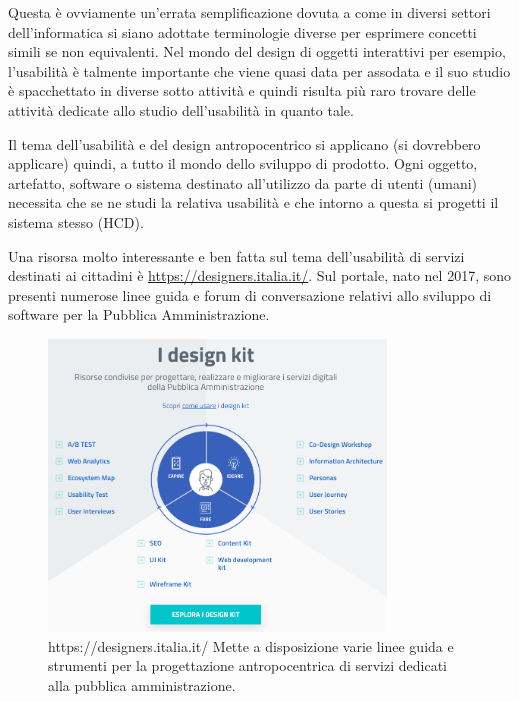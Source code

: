 Questa è ovviamente un'errata semplificazione dovuta a come in diversi settori dell'informatica si siano adottate terminologie diverse per esprimere concetti simili se non equivalenti. Nel mondo del design di oggetti interattivi per esempio, l'usabilità è talmente importante che viene quasi data per assodata e il suo studio è spacchettato in diverse sotto attività e quindi risulta più raro trovare delle attività dedicate allo studio dell'usabilità in quanto tale.

Il tema dell'usabilità e del design antropocentrico si applicano (si dovrebbero applicare) quindi, a tutto il mondo dello sviluppo di prodotto. Ogni oggetto, artefatto, software o sistema destinato all'utilizzo da parte di utenti (umani) necessita che se ne studi la relativa usabilità e che intorno a questa si progetti il sistema stesso (HCD).

Una risorsa molto interessante e ben fatta sul tema dell'usabilità di servizi destinati ai cittadini è \url{https://designers.italia.it/}. Sul portale, nato nel 2017, sono presenti numerose linee guida e forum di conversazione relativi allo sviluppo di software per la Pubblica Amministrazione. 

\begin{figure}[!h]
	\centering
	\includegraphics[width=0.8\textwidth]{immagini/designeritalia}
	\caption{https://designers.italia.it/ Mette a disposizione varie linee guida e strumenti per la progettazione antropocentrica di servizi dedicati alla pubblica amministrazione.}
	\label{designersitalia}
\end{figure}
